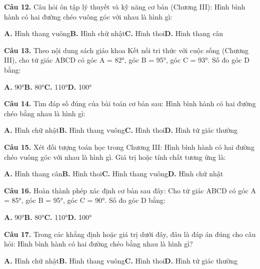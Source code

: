 \documentclass[11pt,a4paper]{article}
\begin{document}
\textbf{\color{primary} Câu 12.} Câu hỏi ôn tập lý thuyết và kỹ năng cơ bản (Chương III): Hình bình hành có hai đường chéo vuông góc với nhau là hình gì:\par
\hspace*{1.5em}\textbf{A.} Hình thang vuông\quad\quad \textbf{B.} Hình chữ nhật\quad\quad \textbf{C.} Hình thoi\quad\quad \textbf{D.} Hình thang cân\par\vspace{2pt}
\textbf{\color{primary} Câu 13.} Theo nội dung sách giáo khoa Kết nối tri thức với cuộc sống (Chương III), cho tứ giác ABCD có góc A = 82°, góc B = 95°, góc C = 93°. Số đo góc D bằng:\par
\hspace*{1.5em}\textbf{A.} 90°\quad\quad \textbf{B.} 80°\quad\quad \textbf{C.} 110°\quad\quad \textbf{D.} 100°\par\vspace{2pt}
\textbf{\color{primary} Câu 14.} Tìm đáp số đúng của bài toán cơ bản sau: Hình bình hành có hai đường chéo bằng nhau là hình gì:\par
\hspace*{1.5em}\textbf{A.} Hình chữ nhật\quad\quad \textbf{B.} Hình thang vuông\quad\quad \textbf{C.} Hình thoi\quad\quad \textbf{D.} Hình tứ giác thường\par\vspace{2pt}
\textbf{\color{primary} Câu 15.} Xét đối tượng toán học trong Chương III: Hình bình hành có hai đường chéo vuông góc với nhau là hình gì. Giá trị hoặc tính chất tương ứng là:\par
\hspace*{1.5em}\textbf{A.} Hình thang cân\quad\quad \textbf{B.} Hình thoi\quad\quad \textbf{C.} Hình thang vuông\quad\quad \textbf{D.} Hình chữ nhật\par\vspace{2pt}
\textbf{\color{primary} Câu 16.} Hoàn thành phép xác định cơ bản sau đây: Cho tứ giác ABCD có góc A = 85°, góc B = 95°, góc C = 90°. Số đo góc D bằng:\par
\hspace*{1.5em}\textbf{A.} 90°\quad\quad \textbf{B.} 80°\quad\quad \textbf{C.} 110°\quad\quad \textbf{D.} 100°\par\vspace{2pt}
\textbf{\color{primary} Câu 17.} Trong các khẳng định hoặc giá trị dưới đây, đâu là đáp án đúng cho câu hỏi: Hình bình hành có hai đường chéo bằng nhau là hình gì?\par
\hspace*{1.5em}\textbf{A.} Hình chữ nhật\quad\quad \textbf{B.} Hình thang vuông\quad\quad \textbf{C.} Hình thoi\quad\quad \textbf{D.} Hình tứ giác thường\par\vspace{2pt}
\end{document}

